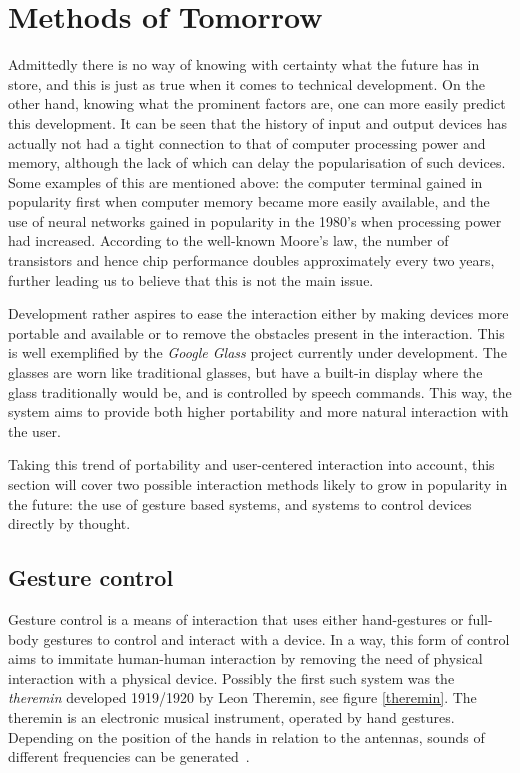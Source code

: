 
\section{Methods of Tomorrow}
\label{future}
Admittedly there is no way of knowing with certainty what the future has in store, and this is just as true when it comes to technical development. On the other hand, knowing what the prominent factors are, one can more easily predict this development. It can be seen that the history of input and output devices has actually not had a tight connection to that of computer processing power and memory, although the lack of which can delay the popularisation of such devices. Some examples of this are mentioned above: the computer terminal gained in popularity first when computer memory became more easily available, and the use of neural networks gained in popularity in the 1980's when processing power had increased. According to the well-known Moore's law, the number of transistors and hence chip performance doubles approximately every two years, further leading us to believe that this is not the main issue.

Development rather aspires to ease the interaction either by making devices more portable and available or to remove the obstacles present in the interaction. This is well exemplified by the \emph{Google Glass} project currently under development. The glasses are worn like traditional glasses, but have a built-in display where the glass traditionally would be, and is controlled by speech commands. This way, the system aims to provide both higher portability and more natural interaction with the user.

Taking this trend of portability and user-centered interaction into account, this section will cover two possible interaction methods likely to grow in popularity in the future: the use of gesture based systems, and systems to control devices directly by thought. 


\subsection{Gesture control}
Gesture control is a means of interaction that uses either hand-gestures or full-body gestures to control and interact with a device. In a way, this form of control aims to immitate human-human interaction by removing the need of physical interaction with a physical device. Possibly the first such system was the \emph{theremin} developed 1919/1920 by Leon Theremin, see figure \ref{theremin}. The theremin is an electronic musical instrument, operated by hand gestures. Depending on the position of the hands in relation to the antennas, sounds of different frequencies can be generated~\cite{thereminpatent}.

